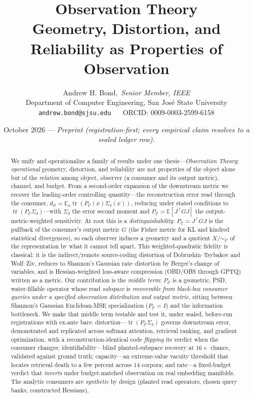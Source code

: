 \documentclass[11pt]{article}
\title{\textbf{Observation Theory}\\[2pt]
\large Geometry, Distortion, and Reliability as Properties of Observation}
\author{Andrew H. Bond,~\emph{Senior Member, IEEE}\\
\small Department of Computer Engineering, San Jos\'e State University\\
\small \texttt{andrew.bond@sjsu.edu} ~\textbar~ ORCID: 0009-0003-2599-6158}
\date{October 2026 --- \emph{Preprint (registration-first; every empirical claim resolves to a sealed ledger row).}}
\theoremstyle{definition}
\theoremstyle{remark}
\newcommand{\PC}{P_{\mathcal{C}}}
\newcommand{\Sd}{\Sigma_{\delta}}
\newcommand{\tr}{\operatorname{tr}}
\newcommand{\dO}{d_{\mathcal{O}}}
\newcommand{\E}{\mathbb{E}}
\begin{document}
\maketitle

\begin{abstract}
We unify and operationalize a family of results under one thesis---\emph{Observation
Theory}: \emph{operational} geometry, distortion, and reliability are not properties
of the object alone but of the \emph{relation} among object, observer (a consumer and
its output metric), channel, and budget. From a second-order expansion of the downstream metric we recover
the leading-order controlling quantity---the reconstruction error read through the
consumer, $\dO=\E_x\tr(\PC(x)\Sd(x))$, reducing under stated conditions to
$\tr(\PC\Sd)$---with $\Sd$ the error second moment and $\PC=\E[J^\top G J]$ the
output-metric-weighted sensitivity. At root this is a \emph{distinguishability}:
$\PC=J^\top G J$ is the pullback of the consumer's output metric $G$ (the Fisher
metric for KL and kindred statistical divergences), so each observer
induces a geometry and a quotient $X/\!\sim_{\mathcal{C}}$ of the representation by
what it cannot tell apart. This weighted-quadratic fidelity is classical:
it is the indirect/remote source-coding distortion of Dobrushin--Tsybakov and
Wolf--Ziv, reduces to Shannon's Gaussian rate--distortion by Berger's
change of variables, and is Hessian-weighted loss-aware compression (OBD/OBS through
GPTQ) written as a metric. Our contribution is the \emph{middle term}: $\PC$ is a
geometric, PSD, water-fillable operator whose read \emph{subspace} is
\emph{recoverable from black-box consumer queries under a specified observation
distribution and output metric},
sitting between Shannon's Gaussian Euclidean-MSE specialization ($\PC=I$) and the
information bottleneck. We make that middle term testable and test it, under sealed, before-run
registrations with ex-ante bars: distortion---$\tr(\PC\Sd)$ governs downstream error,
demonstrated and replicated across softmax attention, retrieval ranking, and
gradient optimization, with a reconstruction-identical code \emph{flipping} its
verdict when the consumer changes; identifiability---blind planted-subspace recovery
at $16\times$ chance, validated against ground truth; capacity---an extreme-value
vacuity threshold that locates retrieval death to a few percent across $14$ corpora;
and rate---a fixed-budget verdict that \emph{inverts} under budget-matched
observation on real embedding manifolds. The analytic consumers are \emph{synthetic}
by design (planted read operators, chosen query banks, constructed Hessians),

\end{abstract}
\end{document}
